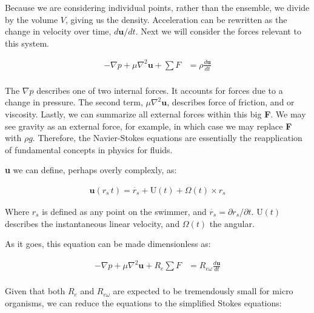 \documentclass[12pt]{report}
\begin{document}
Because we are considering individual points, rather than the ensemble, we divide by the volume $V$, giving us the density. Acceleration can be rewritten as the change in velocity over time, $d\mathbf{u} / dt$. Next we will consider the forces relevant to this system. 

\begin{equation} \label{NSderive2}
\begin{split}
-\nabla p + \mu \nabla^2\mathbf{u} + \sum F & = \rho \frac{d\mathbf{u}}{dt} \\
\end{split}
\end{equation}

The $\nabla p$ describes one of two internal forces. It accounts for forces due to a change in pressure. The second term, $\mu \nabla^2\mathbf{u}$, describes force of friction, and or viscosity. Lastly, we can summarize all external forces within this big \textbf{F}. We may see gravity as an external force, for example, in which case we may replace \textbf{F} with $\rho g$. Therefore, the Navier-Stokes equations are essentially the reapplication of fundamental concepts in physics for fluids.\newline

\textbf{u} we can define, perhaps overly complexly, as:

\begin{equation} \label{NS3}
\begin{split}
\mathbf{u}(r_s\,t) = \dot{r_s} + \mathrm{U}(t) + \Omega(t)\times r_s
\end{split}
\end{equation}

Where $r_s$ is defined as any point on the swimmer, and $\dot{r_s} = \partial r_s / \partial t$. $\mathrm{U}(t)$ describes the instantaneous linear velocity, and $\Omega(t)$ the angular.\newline

As it goes, this equation can be made dimensionless as: 

\begin{equation} \label{NS4}
\begin{split}
-\nabla p + \mu \nabla^2\mathbf{u} + R_e\sum F & = R_{e\omega} \frac{d\mathbf{u}}{dt} \\
\end{split}
\end{equation}

Given that both $R_e$ and $R_{e\omega}$ are expected to be tremendously small for micro organisms, we can reduce the equations to the simplified Stokes equations: 
\end{document}
